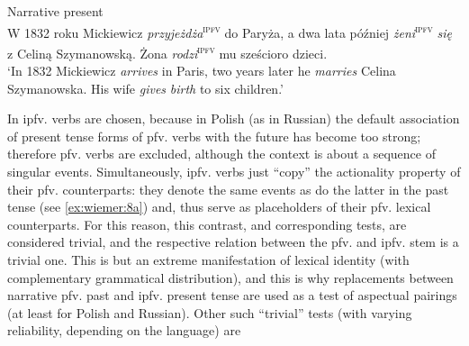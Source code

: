 \documentclass[output=paper]{langscibook}
\begin{document}
\ex
Narrative present \\
\label{ex:wiemer:8b} W 1832 roku Mickiewicz \textit{przyjeżdża}\textsuperscript{\textsc{ipfv}} do Paryża, a dwa lata później \textit{żeni}\textsuperscript{\textsc{ipfv}} \textit{się} z Celiną Szymanowską. Żona \textit{rodzi}\textsuperscript{\textsc{ipfv}} mu sześcioro dzieci.\\
    ‘In 1832 Mickiewicz \textit{arrives} in Paris, two years later he \textit{marries} Celina Szymanowska. His wife \textit{gives} \textit{birth} to six children.’\\
\z
\z


In  ipfv. verbs are chosen, because in Polish (as in Russian) the default association of present tense forms of pfv. verbs with the future has become too strong; therefore pfv. verbs are excluded, although the context is about a sequence of singular events. Simultaneously, ipfv. verbs just “copy” the actionality property of their pfv. counterparts: they denote the same events as do the latter in the past tense (see \ref{ex:wiemer:8a}) and, thus serve as placeholders of their pfv. lexical counterparts. For this reason, this contrast, and corresponding tests, are considered trivial, and the respective relation between the pfv. and ipfv. stem is a trivial one. This is but an extreme manifestation of lexical identity (with complementary grammatical distribution), and this is why replacements between narrative pfv. past and ipfv. present tense are used as a test of aspectual pairings (at least for Polish and Russian). Other such ``trivial'' tests (with varying reliability, depending on the language) are
\end{document}
